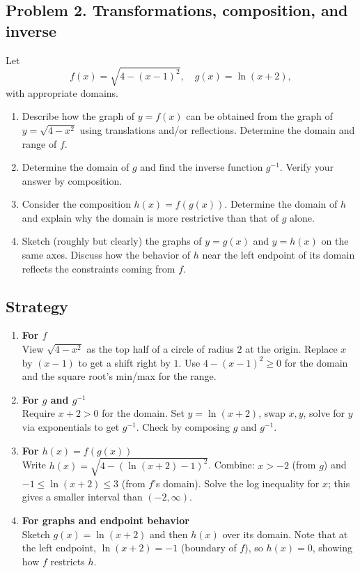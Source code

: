 \subsection{Problem 2. Transformations, composition, and inverse}
Let
\[f(x)=\sqrt{4-(x-1)^{2}}, \quad g(x)=\ln(x+2),\]
with appropriate domains.

\begin{enumerate}[label=(\alph*)]
    \item Describe how the graph of $y=f(x)$ can be obtained from the graph of $y=\sqrt{4-x^{2}}$ using translations and/or reflections. Determine the domain and range of $f$.
    \item Determine the domain of $g$ and find the inverse function $g^{-1}$. Verify your answer by composition.
    \item Consider the composition $h(x)=f(g(x))$. Determine the domain of $h$ and explain why the domain is more restrictive than that of $g$ alone.
    \item Sketch (roughly but clearly) the graphs of $y=g(x)$ and $y=h(x)$ on the same axes. Discuss how the behavior of $h$ near the left endpoint of its domain reflects the constraints coming from $f$.
\end{enumerate}

\subsection*{Strategy}

\begin{enumerate}[label=(\alph*)]

    \item \textbf{For $f$} \\
    View $\sqrt{4 - x^2}$ as the top half of a circle of radius $2$ at the origin.  
    Replace $x$ by $(x-1)$ to get a shift right by $1$.  
    Use $4 - (x-1)^2 \ge 0$ for the domain and the square root’s min/max for the range.

    \item \textbf{For $g$ and $g^{-1}$} \\
    Require $x+2>0$ for the domain.  
    Set $y = \ln(x+2)$, swap $x,y$, solve for $y$ via exponentials to get $g^{-1}$.  
    Check by composing $g$ and $g^{-1}$.

    \item \textbf{For $h(x) = f(g(x))$} \\
    Write $h(x) = \sqrt{4 - (\ln(x+2) - 1)^2}$.  
    Combine: $x>-2$ (from $g$) and $-1 \le \ln(x+2) \le 3$ (from $f$’s domain).  
    Solve the log inequality for $x$; this gives a smaller interval than $(-2,\infty)$.

    \item \textbf{For graphs and endpoint behavior} \\
    Sketch $g(x)=\ln(x+2)$ and then $h(x)$ over its domain.  
    Note that at the left endpoint, $\ln(x+2)=-1$ (boundary of $f$), so $h(x)=0$, showing how $f$ restricts $h$.

\end{enumerate}

